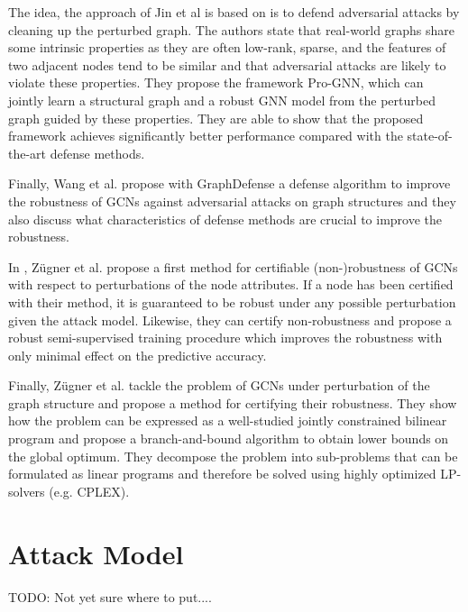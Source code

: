 \documentclass[a4paper,preprint]{sig-alternate}
\begin{document}
The idea, the approach of Jin et al \cite{jin2020graph} is based on is to defend adversarial attacks by cleaning up the perturbed graph.
The authors state that real-world graphs share some intrinsic properties as they are often low-rank, sparse, and the features of two adjacent
nodes tend to be similar and that adversarial attacks are likely to violate these properties.\newline
They propose the framework Pro-GNN, which can jointly learn a structural graph and a robust GNN model from the perturbed graph guided by
these properties. They are able to show that the proposed framework achieves significantly better performance compared with the state-of-the-art 
defense methods.\newline

Finally, Wang et al. \cite{wang2019graphdefense} propose with GraphDefense a defense algorithm to improve the robustness of GCNs
against adversarial attacks on graph structures and they also discuss what characteristics of defense methods are crucial to improve 
the robustness.\newline

In \cite{Z_gner_2019}, Zügner et al. propose a first method for certifiable (non-)robustness of GCNs with respect to 
perturbations of the node attributes. If a node has been certified with their method, it is guaranteed to be robust under any
possible perturbation given the attack model. Likewise, they can certify non-robustness and propose a robust semi-supervised training
procedure which improves the robustness with only minimal effect on the predictive accuracy.\newline

Finally, Zügner et al. \cite{10.1145/3394486.3403217} tackle the problem of GCNs under perturbation of the graph structure and propose a method
for certifying their robustness. They show how the problem can be expressed as a well-studied jointly constrained bilinear program and
propose a branch-and-bound algorithm to obtain lower bounds on the global optimum. They decompose the problem into sub-problems that can
be formulated as linear programs and therefore be solved using highly optimized LP-solvers (e.g. CPLEX).\newline

\section{Attack Model}

TODO: Not yet sure where to put....
\end{document}
